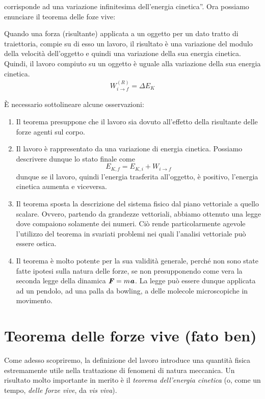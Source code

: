 corrisponde ad una variazione infinitesima dell'energia cinetica''. Ora possiamo
enunciare il teorema delle foze vive:
\vspace{8pt}
\begin{tcolorbox}[colback = red!30, colframe = red!30!black, title = {Teorema dell'energia cinetica (o delle forze vive)}]
    Quando una forza (risultante) applicata a un oggetto per un dato tratto di
    traiettoria, compie su di esso un lavoro, il risultato è una variazione del
    modulo della velocità dell'oggetto e quindi una variazione della sua energia
    cinetica. Quindi, il lavoro compiuto su un oggetto è uguale alla variazione
    della sua energia cinetica.
    \begin{align}
        W_{i\to f}^{(R)} = \Delta E_K\label{forzevive}
    \end{align}
\end{tcolorbox}
\vspace{5pt}

\noindent È necessario sottolineare alcune osservazioni:
\begin{enumerate}
    \item Il teorema presuppone che il lavoro sia dovuto all'effetto della risultante delle forze agenti sul corpo.
    \item Il lavoro è rappresentato da una variazione di energia cinetica. Possiamo descrivere dunque lo stato finale
    come \[ E_{K,f} = E_{K,i} + W_{i\to f} \] dunque se il lavoro, quindi l'energia trasferita all'oggetto, è positivo,
    l'energia cinetica aumenta e viceversa.

    \item Il teorema sposta la descrizione del sistema fisico dal piano vettoriale a quello scalare. Ovvero, partendo
    da grandezze vettoriali, abbiamo ottenuto una legge dove compaiono solamente dei numeri. Ciò rende particolarmente agevole
    l'utilizzo del teorema in svariati problemi nei quali l'analisi vettoriale può essere ostica.

    \item Il teorema è molto potente per la sua validità generale, perché non sono state fatte ipotesi sulla natura delle
    forze, se non presupponendo come vera la seconda legge della dinamica $\textbf{\textit{F}} = m\textbf{\textit{a}}$.
    La legge può essere dunque applicata ad un pendolo, ad una palla da bowling,
    a delle molecole microscopiche in movimento.
\end{enumerate}

\section*{Teorema delle forze vive (fato ben)}
Come adesso scopriremo, la definizione del lavoro introduce una
quantità fisica estremamente utile nella trattazione di fenomeni
di natura meccanica. Un risultato molto importante in merito è
il \textit{teorema dell'energia cinetica} (o, come un tempo,
\textit{delle forze vive}, da \textit{vis viva}).


